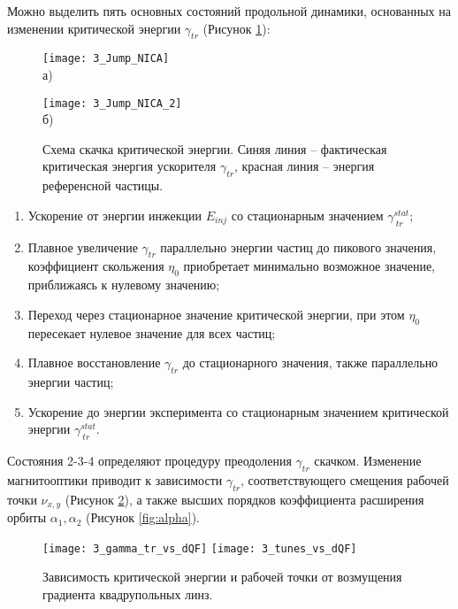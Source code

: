 Можно выделить пять основных состояний продольной динамики, основанных на изменении критической энергии 
$\gamma_{tr}$ (Рисунок \ref{fig:jump_NICA}):

\begin{figure}[ht]
    \begin{minipage}[b][][b]{0.49\linewidth}\centering
        \texttt{[image: 3\_Jump\_NICA]} \\ а)
    \end{minipage}
    \hfill
    \begin{minipage}[b][][b]{0.49\linewidth}\centering
        \texttt{[image: 3\_Jump\_NICA\_2]} \\ б)
    \end{minipage}
    \caption{Схема скачка критической энергии. Синяя линия – фактическая критическая энергия ускорителя $\gamma_{tr}$, красная линия – энергия референсной частицы.}
    \label{fig:jump_NICA}
\end{figure}

\begin{enumerate} 
  \item Ускорение от энергии инжекции $E_{inj}$ со стационарным значением $\gamma_{\ tr}^{stat}$;
  \item  Плавное увеличение $\gamma_{tr}$ параллельно энергии частиц до пикового значения, коэффициент скольжения $\eta_0$ приобретает минимально возможное значение, приближаясь к нулевому значению;
  \item Переход через стационарное значение критической энергии, при этом $\eta_0$ пересекает нулевое значение для всех частиц;
  \item Плавное восстановление $\gamma_{tr}$ до стационарного значения, также па\-рал\-лель\-но энергии частиц;
  \item Ускорение до энергии эксперимента со стационарным значением критической энергии $\gamma_{\ tr}^{stat}$.
  \end{enumerate}
 
Состояния 2-3-4 определяют процедуру преодоления $\gamma_{tr}$ скачком. Из\-ме\-не\-ние магнитооптики приводит к зависимости $\gamma_{tr}$, соответствующего смещения рабочей точки $\nu_{x,y}$ (Рисунок \ref{fig:tr}), а также высших порядков коэффициента расширения орбиты $\alpha_1, \alpha_2$ (Рисунок \ref{fig:alpha}).

\begin{figure}[!h]
   \texttt{[image: 3\_gamma\_tr\_vs\_dQF]}
   \texttt{[image: 3\_tunes\_vs\_dQF]}
   \caption{Зависимость критической энергии и рабочей точки от возмущения градиента квадрупольных линз.}
   \label{fig:tr}
\end{figure}

